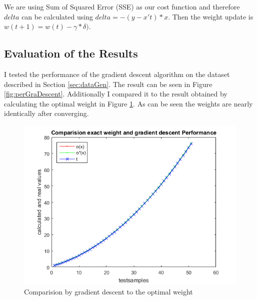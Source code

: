 We are using Sum of Squared Error (SSE) as our cost function and therefore $delta$ can be calculated using $delta = -(y- x't)*x$. Then the weight update is $w(t+1) = w(t) - \gamma*\delta)$.

\subsection{Evaluation of the Results} 

I tested the performance of the gradient descent algorithm on the dataset described in Section \ref{sec:dataGen}. The result can be seen in Figure \ref{fig:perGraDescent}. Additionally I compared it to the result obtained by calculating the optimal weight in Figure \ref{fig:comparision}. As can be seen the weights are nearly identically after converging. 

\begin{figure}[!ht]
		\centering
		\includegraphics[width=1\textwidth]{img/Comparision}
		\caption{Comparision by gradient descent to the optimal weight}
		\label{fig:comparision}
\end{figure}


